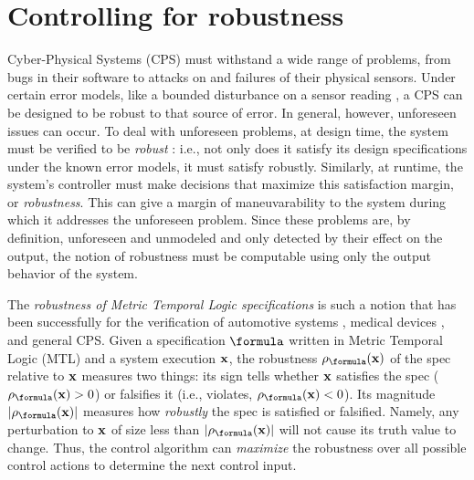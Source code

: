 \section{Controlling for robustness}
\label{sec:intro}
Cyber-Physical Systems (CPS) must withstand a wide range of problems, from bugs in their software to attacks on and failures of their physical sensors.
Under certain error models, like a bounded disturbance on a sensor reading 
, a CPS can be designed to be robust to that source of error.
In general, however, unforeseen issues can occur. 
To deal with unforeseen problems, at design time, the system must be verified to be \textit{robust} : i.e., not only does it satisfy its design specifications under the known error models, it must satisfy robustly.
Similarly, at runtime, the system's controller must make decisions that maximize this satisfaction margin, or \textit{robustness}.
This can give a margin of maneuvarability to the system during which it addresses the unforeseen problem.
Since these problems are, by definition, unforeseen and unmodeled and only detected by their effect on the output, the notion of robustness must be computable using only the output behavior of the system.

The \textit{robustness of Metric Temporal Logic specifications} \cite{Fainekos2006_TLVerifSimu,Donze2010} is such a notion that has been successfully for the verification of automotive systems \cite{Fainekos12_Automotive,Dreossi15_RRTFalsification}, medical devices \cite{SankaranarayananF2012cmsb}, and general CPS.
Given a specification $\formula$ written in Metric Temporal Logic (MTL) and a system execution $\mathbf{x}$, the robustness $\robf(\sstraj)$ of the spec relative to $\mathbf{x}$ measures two things:
its sign tells whether $\mathbf{x}$ satisfies the spec ($\robf(\sstraj) > 0$) or falsifies it (i.e., violates, $\robf(\sstraj) <0$).
Its magnitude $|\robf(\sstraj)|$ measures how \textit{robustly} the spec is satisfied or falsified.
Namely, any perturbation to $\mathbf{x}$ of size less than $|\robf(\sstraj)|$ will not cause its truth value to change.
Thus, the control algorithm can \textit{maximize} the robustness over all possible control actions to determine the next control input.

